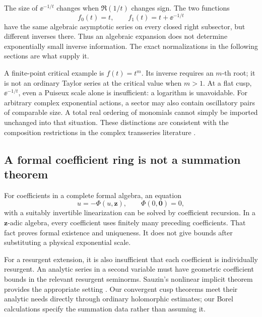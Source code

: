 The size of \(\ee^{-1/t}\) changes when
\(\Re(1/t)\) changes sign.  The two functions
\[
 f_0(t)=t,\qquad f_1(t)=t+\ee^{-1/t}
\]
have the same algebraic asymptotic series on every closed right
subsector, but different inverses there.  Thus an algebraic expansion
does not determine exponentially small inverse information.
The exact normalizations in the following sections are what supply it.

A finite-point critical example is
\(f(t)=t^m\).  Its inverse requires an \(m\)-th root; it is not an
ordinary Taylor series at the critical value when \(m>1\).
At a flat cusp, \(\ee^{-1/t}\), even a Puiseux scale alone is
insufficient: a logarithm is unavoidable.
For arbitrary complex exponential actions, a sector may also contain
oscillatory pairs of comparable size.  A total real ordering of
monomials cannot simply be imported unchanged into that situation.
These distinctions are consistent with the composition restrictions
in the complex transseries literature \cite{vdh-complex}.

\subsection{A formal coefficient ring is not a summation theorem}

For coefficients in a complete formal algebra, an equation
\[
 u=-\Phi(u,\mathbf z),\qquad \Phi(0,\mathbf0)=0,
\]
with a suitably invertible linearization can be solved by coefficient
recursion.  In a \(\mathbf z\)-adic algebra, every coefficient uses
finitely many preceding coefficients.  That fact proves formal
existence and uniqueness.  It does not give bounds after substituting
a physical exponential scale.

For a resurgent extension, it is also insufficient that each
coefficient is individually resurgent.  An analytic series in a
second variable must have geometric coefficient bounds in the
relevant resurgent seminorms.  Sauzin's nonlinear implicit theorem
provides the appropriate setting \cite{sauzin}.  Our convergent
cusp theorems meet their analytic needs directly through ordinary
holomorphic estimates; our Borel calculations specify the
summation data rather than assuming it.

